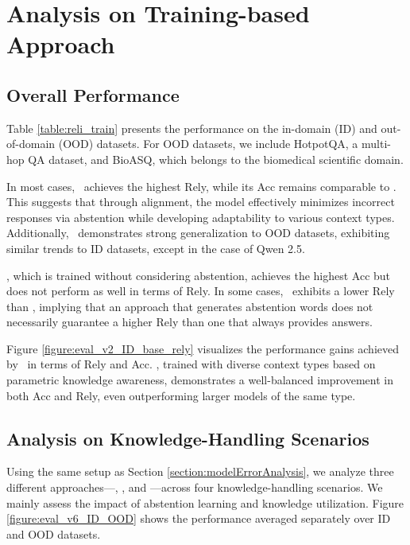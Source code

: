 

\section{Analysis on Training-based Approach}

\subsection{Overall Performance}
\label{section:overallPerformance}


Table \ref{table:reli_train} presents the performance on the in-domain (ID) and out-of-domain (OOD) datasets.
For OOD datasets, we include HotpotQA, a multi-hop QA dataset, and BioASQ, which belongs to the biomedical scientific domain.


In most cases, \ours\ achieves the highest Rely, while its Acc remains comparable to \naive.
This suggests that through alignment, the model effectively minimizes incorrect responses via abstention while developing adaptability to various context types.
Additionally, \ours\ demonstrates strong generalization to OOD datasets, exhibiting similar trends to ID datasets, except in the case of Qwen 2.5.


\baseline, which is trained without considering abstention, achieves the highest Acc but does not perform as well in terms of Rely.
In some cases, \absinst\ exhibits a lower Rely than \baseline, implying that an approach that generates abstention words does not necessarily guarantee a higher Rely than one that always provides answers.



Figure \ref{figure:eval_v2_ID_base_rely} visualizes the performance gains achieved by \ours\ in terms of Rely and Acc.
\ours, trained with diverse context types based on parametric knowledge awareness, demonstrates a well-balanced improvement in both Acc and Rely, even outperforming larger models of the same type.


\subsection{Analysis on Knowledge-Handling Scenarios}




Using the same setup as Section \ref{section:modelErrorAnalysis}, we analyze three different approaches---\absinst, \baseline, and \ours---across four knowledge-handling scenarios.
We mainly assess the impact of abstention learning and knowledge utilization.
Figure \ref{figure:eval_v6_ID_OOD} shows the performance averaged separately over ID and OOD datasets.


